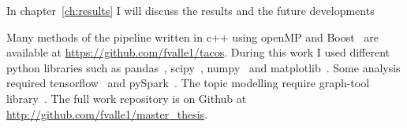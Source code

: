 In chapter~\ref{ch:results} I will discuss the results and the future 
developments

Many methods of the pipeline written in c++ using  openMP and Boost~\cite{siek2002boost} are available at \url{https://github.com/fvalle1/tacos}.
During this work I used different python libraries such as 
pandas~\cite{mckinney2010data}, scipy~\cite{jones2014scipy}, numpy~\cite{oliphant2006guide} and 
matplotlib~\cite{hunter2007matplotlib}. Some analysis required tensorflow~\cite{tensorflow2015-whitepaper} 
and pySpark~\cite{Zaharia:2016:ASU:3013530.2934664}.
The topic modelling require graph-tool library~\cite{peixoto_graph-tool_2014}.
The full work repository is on Github at 
\url{http://github.com/fvalle1/master_thesis}.